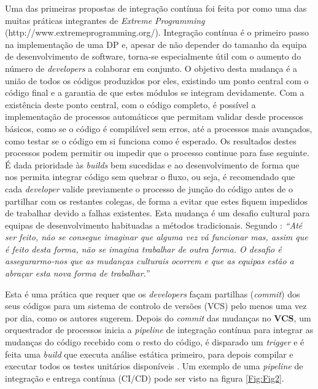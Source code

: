 \hspace{1cm}Uma das primeiras propostas de integração contínua foi feita por  como uma das muitas práticas integrantes de \textit{Extreme Programming} (http://www.extremeprogramming.org/). Integração contínua é o primeiro passo na implementação de uma DP e, apesar de não depender do tamanho da equipa de desenvolvimento de software, torna-se especialmente útil com o aumento do número de \textit{developers} a colaborar em conjunto. O objetivo desta mudança é a união de todos os códigos produzidos por eles, existindo um ponto central com o código final e a garantia de que estes módulos se integram devidamente. Com a existência deste ponto central, com o código completo, é possível a implementação de processos automáticos que permitam validar desde processos básicos, como se o código é compilável sem erros, até a processos mais avançados, como testar se o código em si funciona como é esperado. Os resultados destes processos podem permitir ou impedir que o processo continue para fase seguinte. É dada prioridade às \textit{builds} bem sucedidas e ao desenvolvimento de forma que nos permita integrar código sem quebrar o fluxo, ou seja, é recomendado que cada \textit{developer} valide previamente o processo de junção do código antes de o partilhar com os restantes colegas, de forma a evitar que estes fiquem impedidos de trabalhar devido a falhas existentes. Esta mudança é um desafio cultural para equipas de desenvolvimento habituadas a métodos tradicionais. Segundo : \textit{``Até ser feito, não se consegue imaginar que alguma vez vá funcionar mas, assim que é feito desta forma, não se imagina trabalhar de outra forma. O desafio é assegurarmo-nos que as mudanças culturais ocorrem e que as equipas estão a abraçar esta nova forma de trabalhar.''}

\hspace{1cm}Esta é uma prática que requer que os \textit{developers} façam partilhas (\textit{commit}) dos seus códigos para um sistema de controlo de versões (VCS) pelo menos uma vez por dia, como os autores  sugerem. Depois do \textit{commit} das mudanças no \textbf{VCS}, um orquestrador de processos inicia a \textit{pipeline} de integração contínua para integrar as mudanças do código recebido com o resto do código, é disparado um \textit{trigger} e é feita uma \textit{build} que executa análise estática primeiro, para depois compilar e executar todos os testes unitários disponíveis \cite{raud2016caseStudy}. Um exemplo de uma \textit{pipeline} de integração e entrega contínua (CI/CD) pode ser visto na figura \ref{Fig:Fig2}. 

